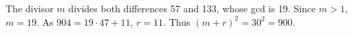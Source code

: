 The divisor $m$ divides both differences 57 and 133, whose gcd is 19. Since $m>1$, $m=19$. As $904=19\cdot47+11$, $r=11$. Thus $(m+r)^2=30^2=\boxed{900}$.
